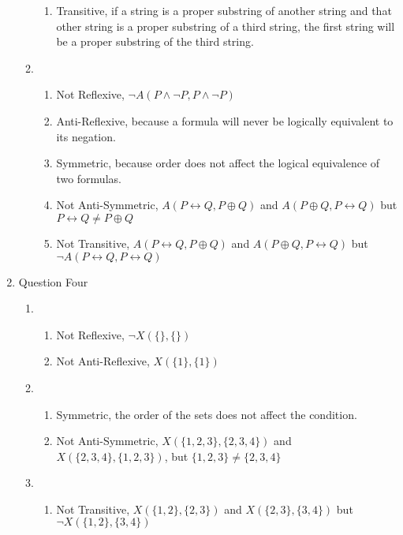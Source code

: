 \documentclass{article}
\begin{document}
\begin{enumerate}
\begin{enumerate}
\begin{enumerate}
            \item Transitive, if a string is a proper substring of another string and that other string is a proper substring of a third string, the first string will be a proper substring of the third string.
        \end{enumerate}
        \item
        \begin{enumerate}
            \item Not Reflexive, $\neg A(P \land \neg P, P \land \neg P)$
            \item Anti-Reflexive, because a formula will never be logically equivalent to its negation.
            \item Symmetric, because order does not affect the logical equivalence of two formulas.
            \item Not Anti-Symmetric, $A(P \leftrightarrow Q, P \oplus Q)$ and $A(P \oplus Q, P \leftrightarrow Q)$ but $P \leftrightarrow Q \neq P \oplus Q$
            \item Not Transitive, $A(P \leftrightarrow Q, P \oplus Q)$ and $A(P \oplus Q, P \leftrightarrow Q)$ but $\neg A(P \leftrightarrow Q, P \leftrightarrow Q)$
        \end{enumerate}
    \end{enumerate}
    \item Question Four
    \begin{enumerate}
        \item
        \begin{enumerate}
            \item Not Reflexive, $\neg X(\{\}, \{\})$
            \item Not Anti-Reflexive, $X(\{1\}, \{1\})$
        \end{enumerate}
        \item
        \begin{enumerate}
            \item Symmetric, the order of the sets does not affect the condition.
            \item Not Anti-Symmetric, $X(\{1,2,3\}, \{2,3,4\})$ and $X(\{2,3,4\}, \{1,2,3\})$, but $\{1,2,3\} \neq \{2,3,4\}$
        \end{enumerate}
        \item
        \begin{enumerate}
            \item Not Transitive, $X(\{1,2\}, \{2,3\})$ and $X(\{2,3\}, \{3,4\})$ but $\neg X(\{1,2\}, \{3,4\})$

\end{enumerate}
\end{enumerate}
\end{enumerate}
\end{document}
